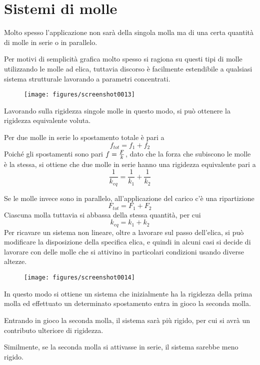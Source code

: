 \documentclass[a4paper, 15pt]{article}
\begin{document}
\section{Sistemi di molle}
\begin{adjustwidth}{2in}{}
	Molto spesso l'applicazione non sarà della singola molla ma di una certa quantità di molle in serie o in parallelo. 
	
	Per motivi di semplicità grafica molto spesso si ragiona su questi tipi di molle utilizzando le molle ad elica, tuttavia discorso è facilmente estendibile a qualsiasi sistema strutturale lavorando a parametri concentrati.  	
	\begin{figure}[H]
		\centering
		\texttt{[image: figures/screenshot0013]}
		\label{fig:screenshot0013}
	\end{figure}
	Lavorando sulla rigidezza singole molle in questo modo, si può ottenere la rigidezza equivalente voluta. 
	
	Per due molle in serie lo spostamento totale è pari a 
	\[f_{tot} = f_1 + f_2 \]
	Poiché gli spostamenti sono pari $ f = {F\over k}$, dato che la forza che subiscono le molle è la stessa, si ottiene che due molle in serie hanno una rigidezza equivalente pari a 
	\[\dfrac{1}{k_{eq}} = \dfrac{1}{k_1} +\dfrac{1}{k_2}\]
	
	Se le molle invece sono in parallelo, all'applicazione del carico c'è una ripartizione 
	\[F_{tot} = F_1 + F_2\]
	Ciascuna molla tuttavia si abbassa della stessa quantità, per cui 
	\[k_{eq} = k_1+k_2\]
	Per ricavare un sistema non lineare, oltre a lavorare sul passo dell'elica, si può modificare la disposizione della specifica elica, e quindi in alcuni casi si decide di lavorare con delle molle che si attivino in particolari condizioni usando diverse altezze. 
\begin{figure}[H]
	\centering
	\texttt{[image: figures/screenshot0014]}
	\label{fig:screenshot0014}
\end{figure}
In questo modo si ottiene un sistema che inizialmente ha la rigidezza della prima molla ed effettuato un determinato spostamento entra in gioco la seconda molla. 

Entrando in gioco la seconda molla, il sistema sarà più rigido, per cui si avrà un contributo ulteriore di rigidezza.  

Similmente, se la seconda molla si attivasse in serie, il sistema sarebbe meno rigido. 


\end{adjustwidth}
\end{document}
